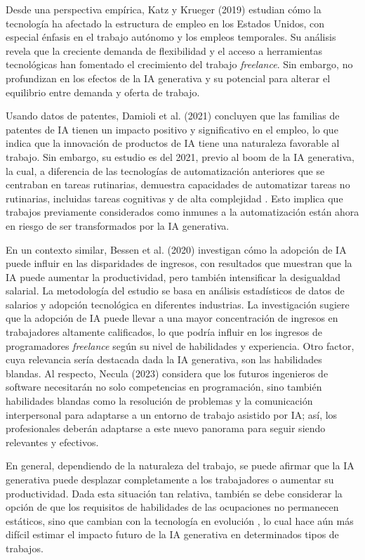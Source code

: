 \documentclass[twocolumn]{article}
\begin{document}
Desde una perspectiva empírica, Katz y Krueger (2019) estudian cómo la tecnología ha afectado la estructura de empleo en los Estados Unidos, con especial énfasis en el trabajo autónomo y los empleos temporales. Su análisis revela que la creciente demanda de flexibilidad y el acceso a herramientas tecnológicas han fomentado el crecimiento del trabajo \emph{freelance}. Sin embargo, no profundizan en los efectos de la IA generativa y su potencial para alterar el equilibrio entre demanda y oferta de trabajo.

Usando datos de patentes, Damioli et al. (2021) concluyen que las familias de patentes de IA tienen un impacto positivo y significativo en el empleo, lo que indica que la innovación de productos de IA tiene una naturaleza favorable al trabajo. Sin embargo, su estudio es del 2021, previo al boom de la IA generativa, la cual, a diferencia de las tecnologías de automatización anteriores que se centraban en tareas rutinarias, demuestra capacidades de automatizar tareas no rutinarias, incluidas tareas cognitivas y de alta complejidad \parencite{oecd2023}. Esto implica que trabajos previamente considerados como inmunes a la automatización están ahora en riesgo de ser transformados por la IA generativa.

En un contexto similar, Bessen et al. (2020) investigan cómo la adopción de IA puede influir en las disparidades de ingresos, con resultados que muestran que la IA puede aumentar la productividad, pero también intensificar la desigualdad salarial. La metodología del estudio se basa en análisis estadísticos de datos de salarios y adopción tecnológica en diferentes industrias. La investigación sugiere que la adopción de IA puede llevar a una mayor concentración de ingresos en trabajadores altamente calificados, lo que podría influir en los ingresos de programadores \emph{freelance} según su nivel de habilidades y experiencia. Otro factor, cuya relevancia sería destacada dada la IA generativa, son las habilidades blandas. Al respecto, Necula (2023) considera que los futuros ingenieros de software necesitarán no solo competencias en programación, sino también habilidades blandas como la resolución de problemas y la comunicación interpersonal para adaptarse a un entorno de trabajo asistido por IA; así, los profesionales deberán adaptarse a este nuevo panorama para seguir siendo relevantes y efectivos.

En general, dependiendo de la naturaleza del trabajo, se puede afirmar que la IA generativa puede desplazar completamente a los trabajadores o aumentar su productividad. Dada esta situación tan relativa, también se debe considerar la opción de que los requisitos de habilidades de las ocupaciones no permanecen estáticos, sino que cambian con la tecnología en evolución \parencite{autor2003}, lo cual hace aún más difícil estimar el impacto futuro de la IA generativa en determinados tipos de trabajos.
\end{document}
